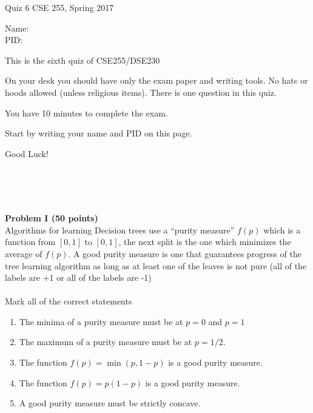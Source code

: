 \documentclass[10pt]{article}
\begin{document}
\setlength\parindent{0pt}
\thispagestyle{empty}

{\textbf \Large Quiz 6} \hfill CSE 255, Spring 2017
\\

\vspace{.1in}

Name: \underline{\hspace{3in}}
\\

PID: \underline{\hspace{3.15in}}

\vspace{.1in}

{\small \setlength\parindent{20pt}This is the sixth quiz of CSE255/DSE230

On your desk you should have only the exam paper and writing tools.
No hats or hoods allowed (unless religious items).
There is one question in this quiz.

You have 10 minutes to complete the exam.

Start by writing your name and PID on this page.

Good Luck!}\\
\underline{\hspace{6in}}

\newcommand{\uu}{\vec{u}}
\newcommand{\xx}{\vec{x}}
\newcommand{\yy}{\vec{y}}
\newcommand{\vmu}{\vec{\mu}}
~\\
~\\
\noindent
    {\bf Problem I (50 points)}\\
    Algorithms for learning Decision trees use a ``purity measure''
    $f(p)$ which is a function from $[0,1]$ to $[0,1]$, the next
    split is the one which minimizes the average of $f(p)$. A good
    purity measure is one that guarantees progress of the tree
    learning algorithm as long as at least one of the leaves is not
    pure (all of the labels are +1 or all of the labels are -1)\\
    ~\\
    Mark all of the correct statements
    \begin{enumerate}
    \item The minima of a purity measure must be at $p=0$ and $p=1$
    \item The maximum of a purity measure must be at $p=1/2$.
    \item The function $f(p)=\min(p,1-p)$ is a good purity measure.
    \item The function $f(p) = p(1-p)$ is a good purity measure.
    \item A good purity measure must be strictly concave.
    \end{enumerate}
    ~\\
    ~\\
\end{document}
